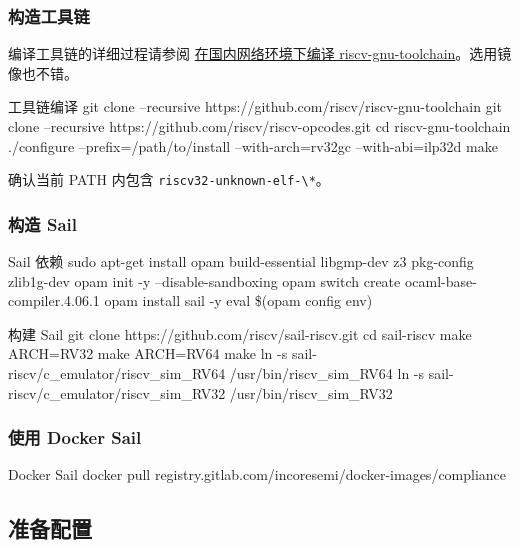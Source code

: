 \documentclass[xcolor=table,dvipsnames,svgnames,aspectratio=169]{ctexbeamer}
\begin{document}
\begin{frame}[fragile]
  \frametitle{构造工具链}

  编译工具链的详细过程请参阅 \href{https://github.com/ArielHeleneto/Work-PLCT/blob/master/help/build-riscv-toolchain.md}{在国内网络环境下编译 riscv-gnu-toolchain}。选用镜像也不错。

  \begin{codeblock}[language=bash]{工具链编译}
git clone --recursive https://github.com/riscv/riscv-gnu-toolchain
git clone --recursive https://github.com/riscv/riscv-opcodes.git
cd riscv-gnu-toolchain
./configure --prefix=/path/to/install --with-arch=rv32gc --with-abi=ilp32d
make
  \end{codeblock}

  确认当前 PATH 内包含 \lstinline|riscv32-unknown-elf-\*|。
\end{frame}

\begin{frame}
  \frametitle{构造 Sail}

  \begin{codeblock}[language=bash]{Sail 依赖}
sudo apt-get install opam  build-essential libgmp-dev z3 pkg-config zlib1g-dev
opam init -y --disable-sandboxing
opam switch create ocaml-base-compiler.4.06.1
opam install sail -y
eval \$(opam config env)

  \end{codeblock}
  \begin{codeblock}[language=bash]{构建 Sail}
git clone https://github.com/riscv/sail-riscv.git
cd sail-riscv
make
ARCH=RV32 make
ARCH=RV64 make
ln -s sail-riscv/c_emulator/riscv_sim_RV64 /usr/bin/riscv_sim_RV64
ln -s sail-riscv/c_emulator/riscv_sim_RV32 /usr/bin/riscv_sim_RV32
  \end{codeblock}
\end{frame}

\begin{frame}[fragile]
  \frametitle{使用 Docker Sail}

  \begin{codeblock}[language=bash]{Docker Sail}
docker pull registry.gitlab.com/incoresemi/docker-images/compliance
  \end{codeblock}

\end{frame}

\subsection{准备配置}
\end{document}
